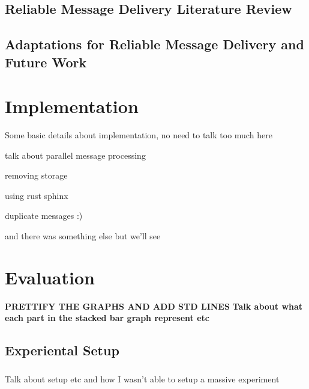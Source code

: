 \documentclass[a4paper,11pt,oneside]{report}
\begin{document}
\section{Reliable Message Delivery Literature Review}

\section{Adaptations for Reliable Message Delivery and Future Work}

\chapter{Implementation}



Some basic details about implementation, no need to talk too much here

talk about parallel message processing

removing storage

using rust sphinx

duplicate messages :)

and there was something else but we'll see

\chapter{Evaluation}



\textbf{PRETTIFY THE GRAPHS AND ADD STD LINES}
\textbf{Talk about what each part in the stacked bar graph represent etc}


\section{Experiental Setup}

\subsection{}
Talk about setup etc and how I wasn't able to setup a massive experiment
\end{document}
